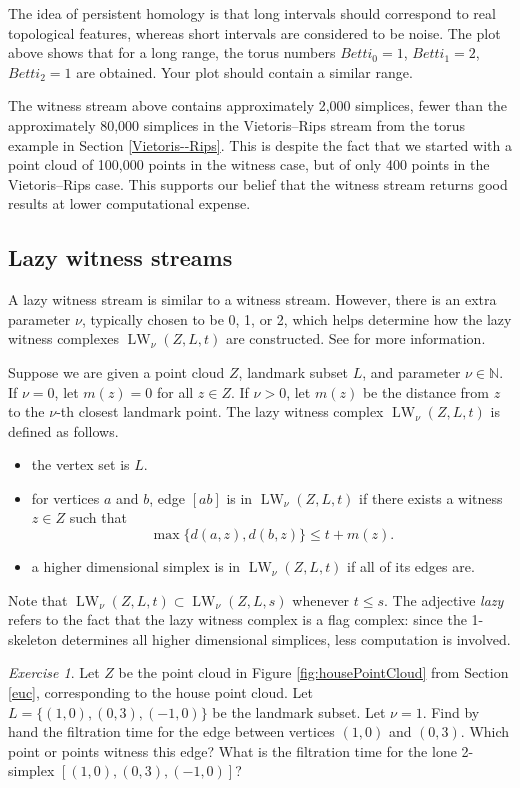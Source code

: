 \documentclass[amscd, amssymb, verbatim]{amsart}[12pt]
\theoremstyle{remark}
\newtheorem{exercise}{Exercise}
\theoremstyle{remark}
\theoremstyle{remark}
\DeclareMathOperator{\LW}{LW}
\begin{document}
The idea of persistent homology is that long intervals should correspond to real topological features, whereas short intervals are considered to be noise. The plot above shows that for a long range, the torus numbers $Betti_0 = 1$, $Betti_1 = 2$, $Betti_2 = 1$ are obtained. Your plot should contain a similar range.

The witness stream above contains approximately 2,000 simplices, fewer than the approximately 80,000 simplices in the Vietoris--Rips stream from the torus example in Section \ref{Vietoris--Rips}. This is despite the fact that we started with a point cloud of 100,000 points in the witness case, but of only 400 points in the Vietoris--Rips case. This supports our belief that the witness stream returns good results at lower computational expense. 


\subsection{Lazy witness streams}
A lazy witness stream is similar to a witness stream. However, there is an extra parameter $\nu$, typically chosen to be 0, 1, or 2, which helps determine how the lazy witness complexes $\LW_\nu(Z,L,t)$ are constructed. See \citet{WitnessComplexes} for more information. 

Suppose we are given a point cloud $Z$, landmark subset $L$, and parameter $\nu\in\mathbb{N}$. If $\nu = 0$, let $m(z) = 0$ for all $z\in Z$. If $\nu >0$, let $m(z)$ be the distance from $z$ to the $\nu$-th closest landmark point. The lazy witness complex $\LW_\nu(Z,L,t)$ is defined as follows.
\begin{itemize}
\item{the vertex set is $L$.}
\item{for vertices $a$ and $b$, edge $[ab]$ is in $\LW_\nu(Z,L,t)$ if there exists a witness $z \in Z$ such that $$\max\bigl\{d(a,z), d(b,z)\bigr\} \leq t+m(z).$$}
\item{a higher dimensional simplex is in $\LW_\nu(Z,L,t)$ if all of its edges are.} 
\end{itemize}
Note that $\LW_\nu(Z,L,t) \subset \LW_\nu(Z,L,s)$ whenever $t\leq s$. The adjective {\em lazy} refers to the fact that the lazy witness complex is a flag complex: since the 1-skeleton determines all higher dimensional simplices, less computation is involved. 

\begin{exercise}
Let $Z$ be the point cloud in Figure \ref{fig:housePointCloud} from Section \ref{euc}, corresponding to the house point cloud. Let $L = \{(1,0),(0,3),(-1,0)\}$ be the landmark subset. Let $\nu = 1$. Find by hand the filtration time for the edge between vertices $(1,0)$ and $(0,3)$. Which point or points witness this edge? What is the filtration time for the lone 2-simplex $[(1,0),(0,3),(-1,0)]$? 
\end{exercise}
\end{document}
